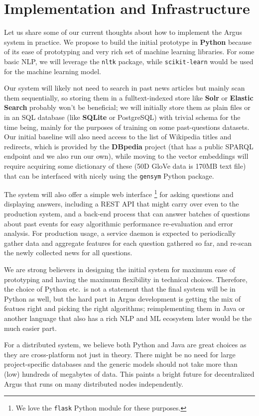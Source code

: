\documentclass[11pt,a4paper]{article}
\begin{document}
\section{Implementation and Infrastructure}
\label{infra}

Let us share some of our current thoughts about how to implement the Argus system in practice.
We propose to build the initial prototype in \textbf{Python} because of its ease of
prototyping and very rich set of machine learning libraries.
For some basic NLP, we will leverage the \texttt{nltk} package,
while \texttt{scikit-learn} would be used
for the machine learning model.

Our system will likely not need to search in past news articles
but mainly scan them sequentially, so storing them in a fulltext-indexed
store like \textbf{Solr} or \textbf{Elastic Search} probably won't be
beneficial; we will initially store them as plain files or in an SQL
database (like \textbf{SQLite} or PostgreSQL) with trivial schema for the time being,
mainly for the purposes of training on some past-questions datasets.
Our initial baseline will also need access to the list of Wikipedia
titles and redirects, which is provided by the \textbf{DBpedia} project (that
has a public SPARQL endpoint and we also run our own), while moving
to the vector embeddings will require acquiring some dictionary of
these (50D GloVe data is 170MB text file) that can be interfaced with
nicely using the \texttt{gensym} Python package.

The system will also offer a simple web interface%
\footnote{We love the \texttt{flask} Python module for these purposes.}
for asking questions
and displaying answers, including a REST API that might carry over even
to the production system, and a back-end process that can answer batches
of questions about past events for easy algorithmic performance re-evaluation
and error analysis.
For production usage,
a service daemon is expected to periodically gather data and aggregate
features for each question gathered so far, and re-scan the newly collected
news for all questions.

We are strong believers in designing the initial system for maximum
ease of prototyping and having the maximum flexibility in technical
choices.  Therefore, the choice of Python etc.\ is not a statement
that the final system will be in Python as well, but the hard part
in Argus development is getting the mix of featues right and picking
the right algorithms; reimplementing them in Java or another language
that also has a rich NLP and ML ecosystem later would be the much easier
part.

For a distributed system, we believe both Python and Java are great
choices as they are cross-platform not just in theory.  There might
be no need for large project-specific databases and the generic models
should not take more than (low) hundreds of megabytes of data.  This
paints a bright future for decentralized Argus that runs on many
distributed nodes independently.



\end{document}
